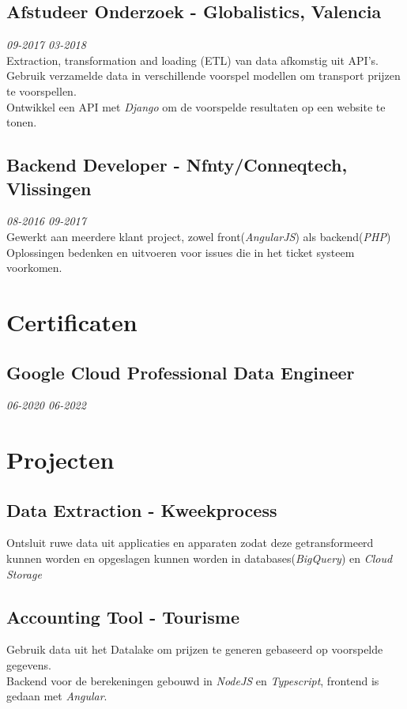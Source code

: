 \documentclass{article}
\begin{document}
\subsection{Afstudeer Onderzoek - Globalistics, Valencia} \hfill {\em 09-2017 03-2018} \\
Extraction, transformation and loading (ETL) van data afkomstig uit API's.\\
Gebruik verzamelde data in verschillende voorspel modellen om transport prijzen te voorspellen. \\
Ontwikkel een API met \emph{Django} om de voorspelde resultaten op een website te tonen. \\


\subsection{Backend Developer - Nfnty/Conneqtech, Vlissingen} \hfill {\em 08-2016 09-2017} \\
Gewerkt aan meerdere klant project, zowel front(\emph{AngularJS}) als backend(\emph{PHP})
Oplossingen bedenken en uitvoeren voor issues die in het ticket systeem voorkomen.

\section{Certificaten}
\subsection{Google Cloud Professional Data Engineer}\hfill {\em 06-2020 06-2022} \\

\section{Projecten}
\subsection{Data Extraction - Kweekprocess}
Ontsluit ruwe data uit applicaties en apparaten zodat deze getransformeerd kunnen worden en opgeslagen kunnen worden in databases(\emph{BigQuery}) en \emph{Cloud Storage} \\

\subsection{Accounting Tool - Tourisme}
Gebruik data uit het Datalake om prijzen te generen gebaseerd op voorspelde gegevens. \\
Backend voor de berekeningen gebouwd in \emph{NodeJS} en \emph{Typescript}, frontend is gedaan met \emph{Angular}.
\end{document}
